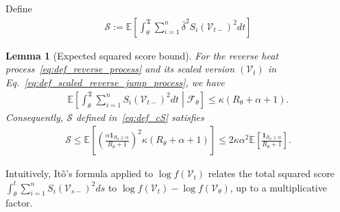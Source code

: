 \documentclass[11pt]{article}
\newcommand{\excess}{\alpha}
\newcommand{\cS}{\mathcal{S}}
\newcommand{\btau}{\kappa}
\newcommand{\bdelta}{\bar{\delta}}
\newcommand{\stopT}{{\boldsymbol{\mathfrak{T}}}}
\newcommand{\sF}{\mathscr{F}}
\newcommand{\rV}{\mathscr{V}}
\theoremstyle{named}
\theoremstyle{plain}
\newtheorem{lemma}{Lemma}
\newcommand{\defn}{:=}
\newcommand{\Exs}{\ensuremath{{\mathbb{E}}}}
\newcommand{\brackets}[1]{\left[ #1 \right]}
\newcommand{\parenth}[1]{\left( #1 \right)}
\begin{document}
Define
\begin{align}
  \label{eq:def_cS}
  \cS \defn \Exs \brackets{ \int_{\theta}^{\stopT} \sum_{i=1}^n \bdelta^2 S_i(\rV_{t-})^2 dt}
\end{align}
\begin{lemma}[Expected squared score bound] 
  \label{lem:expected_squared_score_bound}
  For the reverse heat process~\eqref{eq:def_reverse_process} and its scaled version $(\rV_t)$ in Eq.~\eqref{eq:def_scaled_reverse_jump_process}, we have
  \begin{align*}
    \Exs \brackets{ \int_{\theta}^{\stopT} \sum_{i=1}^n S_i(\rV_{t-})^2 dt \middle| \sF_\theta} \leq \btau (R_\theta + \excess + 1).
  \end{align*}
  Consequently, $\cS$ defined in~\eqref{eq:def_cS} satisfies
  \begin{align*}
    \cS \leq \Exs \brackets{\parenth{\frac{\excess \mathbf{1}_{R_\theta \geq \excess}}{R_\theta + 1} }^2 \btau (R_\theta + \excess + 1)} \leq 2 \btau \excess^2 \Exs\brackets{\frac{\mathbf{1}_{R_\theta \geq \excess}}{R_\theta + 1}}.
  \end{align*}
\end{lemma}
Intuitively, It\^o's formula applied to $\log f(\rV_t)$ relates the total squared score $\int_\theta^t \sum_{i=1}^n S_i(\rV_{s-})^2 ds$ to $\log f(\rV_t) - \log f(\rV_\theta)$, up to a multiplicative factor.
\end{document}
